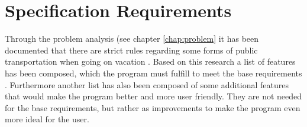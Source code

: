 \section{Specification Requirements}
\label{sec:Spec}
Through the problem analysis (see chapter \ref{chap:problem} it has been documented that there are strict rules regarding some forms of public transportation when going on vacation . Based on this research a list of features has been composed, which the program must fulfill to meet the base requirements . Furthermore another list has also been composed of some additional features that would make the program better and more user friendly. They are not needed for the base requirements, but rather as improvements to make the program even more ideal for the user.

